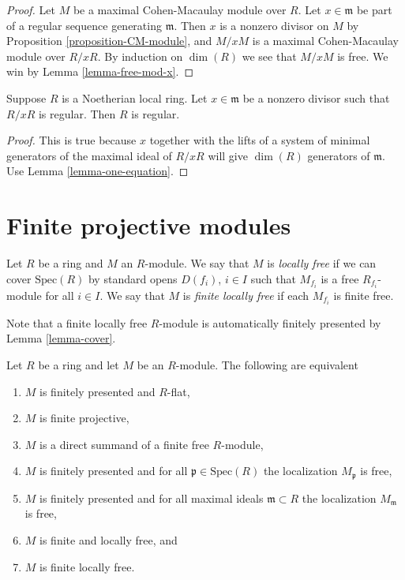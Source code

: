 \begin{proof}
Let $M$ be a maximal Cohen-Macaulay module over $R$.
Let $x \in \mathfrak m$ be part of a regular sequence
generating $\mathfrak m$. Then $x$ is a nonzero divisor
on $M$ by Proposition \ref{proposition-CM-module}, and
$M/xM$ is a maximal Cohen-Macaulay module over $R/xR$.
By induction on $\dim(R)$ we see that $M/xM$ is free.
We win by Lemma \ref{lemma-free-mod-x}.
\end{proof}

\begin{lemma}
\label{lemma-regular-mod-x}
Suppose $R$ is a Noetherian local ring.
Let $x \in \mathfrak m$ be a nonzero divisor
such that $R/xR$ is regular. Then $R$ is regular.
\end{lemma}

\begin{proof}
This is true because $x$ together with the lifts of a system
of minimal generators of the maximal ideal of $R/xR$ will give
$\dim(R)$ generators of $\mathfrak m$.
Use Lemma \ref{lemma-one-equation}.
\end{proof}








\section{Finite projective modules}
\label{section-finite-projective-modules}

\begin{definition}
\label{definition-locally-free}
Let $R$ be a ring and $M$ an $R$-module.
We say that $M$ is {\it locally free} if
we can cover $\text{Spec}(R)$ by standard
opens $D(f_i)$, $i \in I$ such that $M_{f_i}$
is a free $R_{f_i}$-module for all $i \in I$.
We say that $M$ is {\it finite locally free} if
each $M_{f_i}$ is finite free.
\end{definition}

\noindent
Note that a finite locally free $R$-module is
automatically finitely presented by Lemma \ref{lemma-cover}.

\begin{lemma}
\label{lemma-finite-projective}
Let $R$ be a ring and let $M$ be an $R$-module.
The following are equivalent
\begin{enumerate}
\item $M$ is finitely presented and $R$-flat,
\item $M$ is finite projective,
\item $M$ is a direct summand of a finite free $R$-module,
\item $M$ is finitely presented and
for all $\mathfrak p \in \text{Spec}(R)$ the
localization $M_{\mathfrak p}$ is free,
\item $M$ is finitely presented and
for all maximal ideals $\mathfrak m \subset R$ the
localization $M_{\mathfrak m}$ is free,
\item $M$ is finite and locally free, and
\item $M$ is finite locally free.
\end{enumerate}
\end{lemma}

